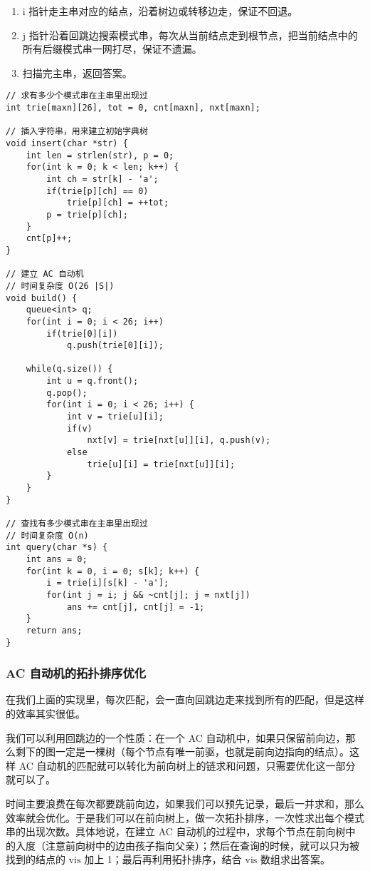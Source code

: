 \documentclass[UTF8]{article}
\begin{document}
\begin{enumerate}
	\item i 指针走主串对应的结点，沿着树边或转移边走，保证不回退。												
	\item j 指针沿着回跳边搜索模式串，每次从当前结点走到根节点，把当前结点中的所有后缀模式串一网打尽，保证不遗漏。
	\item 扫描完主串，返回答案。
\end{enumerate}

\begin{lstlisting}[caption=AC 自动机]
// 求有多少个模式串在主串里出现过
int trie[maxn][26], tot = 0, cnt[maxn], nxt[maxn];

// 插入字符串，用来建立初始字典树
void insert(char *str) {
	int len = strlen(str), p = 0;
	for(int k = 0; k < len; k++) {
		int ch = str[k] - 'a';
		if(trie[p][ch] == 0)
			trie[p][ch] = ++tot;
		p = trie[p][ch];
	}
	cnt[p]++;
}

// 建立 AC 自动机
// 时间复杂度 O(26 |S|)
void build() {
    queue<int> q;
    for(int i = 0; i < 26; i++)
        if(trie[0][i])
            q.push(trie[0][i]);
    
    while(q.size()) {
        int u = q.front();
        q.pop();
        for(int i = 0; i < 26; i++) {
            int v = trie[u][i];
            if(v)
                nxt[v] = trie[nxt[u]][i], q.push(v);
            else
                trie[u][i] = trie[nxt[u]][i];
        }
    }
}

// 查找有多少模式串在主串里出现过
// 时间复杂度 O(n)
int query(char *s) {
    int ans = 0;
    for(int k = 0, i = 0; s[k]; k++) {
        i = trie[i][s[k] - 'a'];
        for(int j = i; j && ~cnt[j]; j = nxt[j])
            ans += cnt[j], cnt[j] = -1;
    }
    return ans;
}
\end{lstlisting}



\subsubsection{AC 自动机的拓扑排序优化}
在我们上面的实现里，每次匹配，会一直向回跳边走来找到所有的匹配，但是这样的效率其实很低。

我们可以利用回跳边的一个性质：在一个 AC 自动机中，如果只保留前向边，那么剩下的图一定是一棵树（每个节点有唯一前驱，也就是前向边指向的结点）。这样 AC 自动机的匹配就可以转化为前向树上的链求和问题，只需要优化这一部分就可以了。

时间主要浪费在每次都要跳前向边，如果我们可以预先记录，最后一并求和，那么效率就会优化。于是我们可以在前向树上，做一次拓扑排序，一次性求出每个模式串的出现次数。具体地说，在建立 AC 自动机的过程中，求每个节点在前向树中的入度（注意前向树中的边由孩子指向父亲）；然后在查询的时候，就可以只为被找到的结点的 $\mathrm{vis}$ 加上 1；最后再利用拓扑排序，结合 $\mathrm{vis}$ 数组求出答案。
\end{document}
